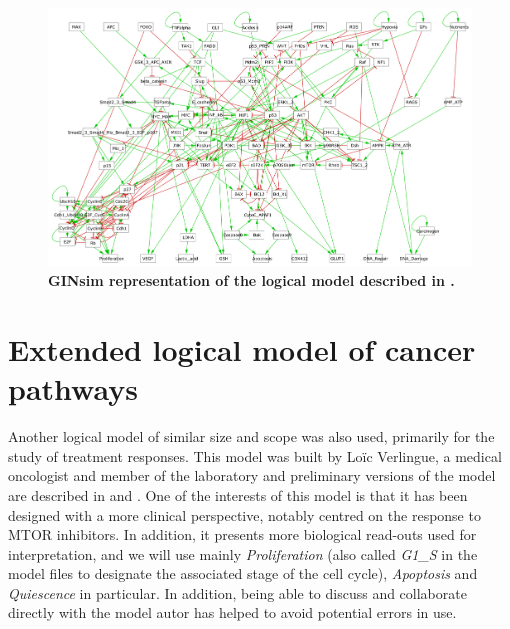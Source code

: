 \documentclass[a4paper,12pt,twoside,onecolumn,openright,final,oldfontcommands]{memoir}
\begin{document}
\begin{figure}

{\centering \includegraphics[width=0.9\linewidth]{fig/Fumia2013} 

}

\caption[Graphical abstract of PROFILE method to personalize logical models with omics data]{\textbf{GINsim representation of the logical model
described in \citet{fumia2013boolean}.}}\label{fig:Fumia}
\end{figure}




\section{Extended logical model of cancer
pathways}\label{appendix-verlingue}

Another logical model of similar size and scope was also used, primarily
for the study of treatment responses. This model was built by Loïc
Verlingue, a medical oncologist and member of the laboratory and
preliminary versions of the model are described in
\citet{verlingue2016comprehensive} and \citet{verlingue2016silico}. One
of the interests of this model is that it has been designed with a more
clinical perspective, notably centred on the response to MTOR
inhibitors. In addition, it presents more biological read-outs used for
interpretation, and we will use mainly \emph{Proliferation} (also called
\emph{G1\_S} in the model files to designate the associated stage of the
cell cycle), \emph{Apoptosis} and \emph{Quiescence} in particular. In
addition, being able to discuss and collaborate directly with the model
autor has helped to avoid potential errors in use.
\end{document}
